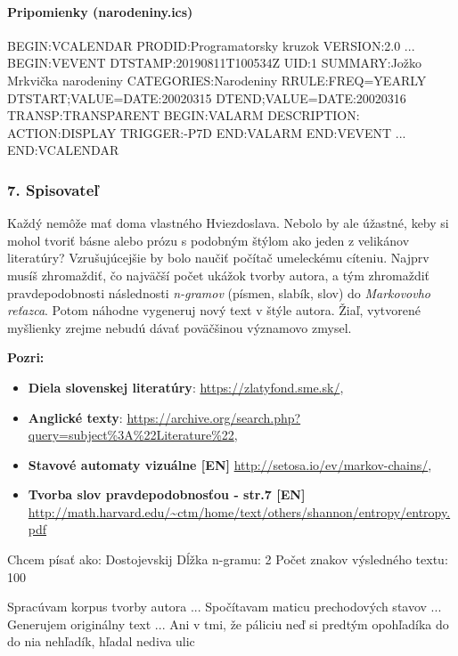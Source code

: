 \paragraph{Pripomienky (narodeniny.ics)}
\begin{code}
BEGIN:VCALENDAR
PRODID:Programatorsky kruzok
VERSION:2.0
...
BEGIN:VEVENT
DTSTAMP:20190811T100534Z
UID:1
SUMMARY:Jožko Mrkvička narodeniny
CATEGORIES:Narodeniny
RRULE:FREQ=YEARLY
DTSTART;VALUE=DATE:20020315
DTEND;VALUE=DATE:20020316
TRANSP:TRANSPARENT
BEGIN:VALARM
DESCRIPTION:
ACTION:DISPLAY
TRIGGER:-P7D
END:VALARM
END:VEVENT
...
END:VCALENDAR
\end{code}

\subsubsection*{7. Spisovateľ}
Každý nemôže mať doma vlastného Hviezdoslava. Nebolo by ale úžastné, keby si mohol tvoriť básne alebo prózu s podobným štýlom ako jeden z velikánov literatúry? Vzrušujúcejšie by bolo naučiť počítač umeleckému cíteniu. Najprv musíš zhromaždiť, čo najväčší počet ukážok tvorby autora, a tým zhromaždiť pravdepodobnosti následnosti \textit{n-gramov} (písmen, slabík, slov) do \textit{Markovovho reťazca}. Potom náhodne vygeneruj nový text v štýle autora. Žiaľ, vytvorené myšlienky zrejme nebudú dávať poväčšinou významovo zmysel.

\textbf{Pozri:}
\begin{itemize}
\itemsep0pt
\item \textbf{Diela slovenskej literatúry}: \url{https://zlatyfond.sme.sk/}, 
\item \textbf{Anglické texty}: \url{https://archive.org/search.php?query=subject%3A%22Literature%22}, 
\item \textbf{Stavové automaty vizuálne [EN]} \url{http://setosa.io/ev/markov-chains/}, 
\item \textbf{Tvorba slov pravdepodobnosťou - str.7 [EN]} \url{http://math.harvard.edu/~ctm/home/text/others/shannon/entropy/entropy.pdf}
\end{itemize}

\begin{code}
Chcem písať ako: Dostojevskij
Dĺžka n-gramu: 2
Počet znakov výsledného textu: 100

Spracúvam korpus tvorby autora ...
Spočítavam maticu prechodových stavov ...
Generujem originálny text ...
Ani v tmi, že páliciu neď si predtým opohľadíka do do nia nehľadík, hľadal nediva ulic
\end{code}



